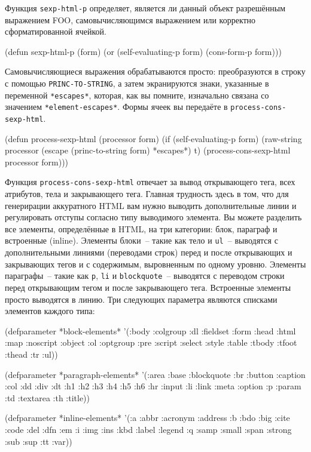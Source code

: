 Функция \lstinline{sexp-html-p} определяет, является ли данный объект разрешённым выражением
FOO, самовычисляющимся выражением или корректно сформатированной ячейкой.

\begin{myverb}
(defun sexp-html-p (form)
  (or (self-evaluating-p form) (cons-form-p form)))
\end{myverb}

Самовычисляющиеся выражения обрабатываются просто: преобразуются в строку с помощью
\lstinline{PRINC-TO-STRING}, а затем экранируются знаки, указанные в переменной
\lstinline{*escapes*}, которая, как вы помните, изначально связана со значением
\lstinline{*element-escapes*}. Формы ячеек вы передаёте в \lstinline{process-cons-sexp-html}.

\begin{myverb}
(defun process-sexp-html (processor form)
  (if (self-evaluating-p form)
    (raw-string processor (escape (princ-to-string form) *escapes*) t)
    (process-cons-sexp-html processor form)))
\end{myverb}

Функция \lstinline{process-cons-sexp-html} отвечает за вывод открывающего тега, всех атрибутов,
тела и закрывающего тега. Главная трудность здесь в том, что для генерирации аккуратного
HTML вам нужно выводить дополнительные линии и регулировать отступы согласно типу
выводимого элемента. Вы можете разделить все элементы, определённые в HTML, на три
категории: блок, параграф и встроенные (inline). Элементы блоки~-- такие как тело и \lstinline{ul}~--
выводятся с дополнительными линиями (переводами строк) перед и после открывающих и
закрывающих тегов и с содержимым, выровненным по одному уровню. Элементы параграфы~--
такие как \lstinline{p}, \lstinline{li} и \lstinline{blockquote}~-- выводятся с переводом строки перед
открывающим тегом и после закрывающего тега. Встроенные элементы просто выводятся в
линию. Три следующих параметра являются списками элементов каждого типа:

\begin{myverb}
(defparameter *block-elements*
  '(:body :colgroup :dl :fieldset :form :head :html :map :noscript :object
    :ol :optgroup :pre :script :select :style :table :tbody :tfoot :thead
    :tr :ul))

(defparameter *paragraph-elements*
  '(:area :base :blockquote :br :button :caption :col :dd :div :dt :h1
    :h2 :h3 :h4 :h5 :h6 :hr :input :li :link :meta :option :p :param
    :td :textarea :th :title))

(defparameter *inline-elements*
  '(:a :abbr :acronym :address :b :bdo :big :cite :code :del :dfn :em
    :i :img :ins :kbd :label :legend :q :samp :small :span :strong :sub
    :sup :tt :var))
\end{myverb}


